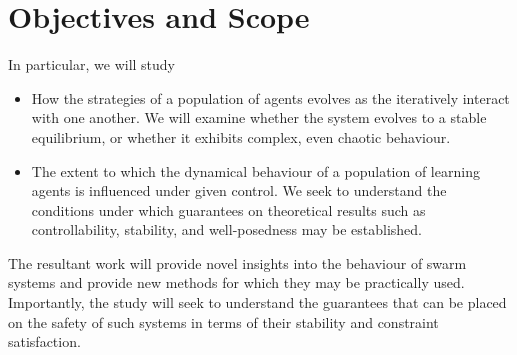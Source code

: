 \documentclass[.../main.tex]{subfiles}
\begin{document}
    \section{Objectives and Scope} \label{sec::Objectives_and_Scope}

    In particular, we will study

    \begin{itemize}
    	\item How the strategies of a population of agents evolves as the iteratively interact
    	with one another. We will examine whether the system evolves to a stable equilibrium, or
    	whether it exhibits complex, even chaotic behaviour.
    	\item The extent to which the dynamical behaviour of a population of learning agents is
    	influenced under given control. We seek to understand the conditions under which guarantees
    	on theoretical results such as controllability, stability, and well-posedness may be
    	established.
    \end{itemize}

    The resultant work will provide novel insights into the behaviour of swarm systems and provide
    new methods for which they may be practically used. Importantly, the study will seek to
    understand the guarantees that can be placed on the safety of such systems in terms of their
    stability and constraint satisfaction.

\end{document}
